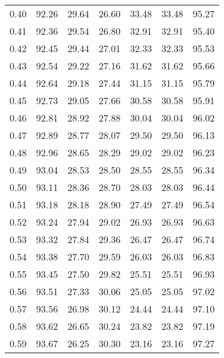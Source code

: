 \begin{tabular}{|c|c|c|c|c|c|c|}
      0.40 &     92.26 &     29.64 &      26.60 &   33.48 &      33.48 &         95.27 \\
      0.41 &     92.36 &     29.54 &      26.80 &   32.91 &      32.91 &         95.40 \\
      0.42 &     92.45 &     29.44 &      27.01 &   32.33 &      32.33 &         95.53 \\
      0.43 &     92.54 &     29.22 &      27.16 &   31.62 &      31.62 &         95.66 \\
      0.44 &     92.64 &     29.18 &      27.44 &   31.15 &      31.15 &         95.79 \\
      0.45 &     92.73 &     29.05 &      27.66 &   30.58 &      30.58 &         95.91 \\
      0.46 &     92.81 &     28.92 &      27.88 &   30.04 &      30.04 &         96.02 \\
      0.47 &     92.89 &     28.77 &      28.07 &   29.50 &      29.50 &         96.13 \\
      0.48 &     92.96 &     28.65 &      28.29 &   29.02 &      29.02 &         96.23 \\
      0.49 &     93.04 &     28.53 &      28.50 &   28.55 &      28.55 &         96.34 \\
      0.50 &     93.11 &     28.36 &      28.70 &   28.03 &      28.03 &         96.44 \\
      0.51 &     93.18 &     28.18 &      28.90 &   27.49 &      27.49 &         96.54 \\
      0.52 &     93.24 &     27.94 &      29.02 &   26.93 &      26.93 &         96.63 \\
      0.53 &     93.32 &     27.84 &      29.36 &   26.47 &      26.47 &         96.74 \\
      0.54 &     93.38 &     27.70 &      29.59 &   26.03 &      26.03 &         96.83 \\
      0.55 &     93.45 &     27.50 &      29.82 &   25.51 &      25.51 &         96.93 \\
      0.56 &     93.51 &     27.33 &      30.06 &   25.05 &      25.05 &         97.02 \\
      0.57 &     93.56 &     26.98 &      30.12 &   24.44 &      24.44 &         97.10 \\
      0.58 &     93.62 &     26.65 &      30.24 &   23.82 &      23.82 &         97.19 \\
      0.59 &     93.67 &     26.25 &      30.30 &   23.16 &      23.16 &         97.27 \\

\end{tabular}
